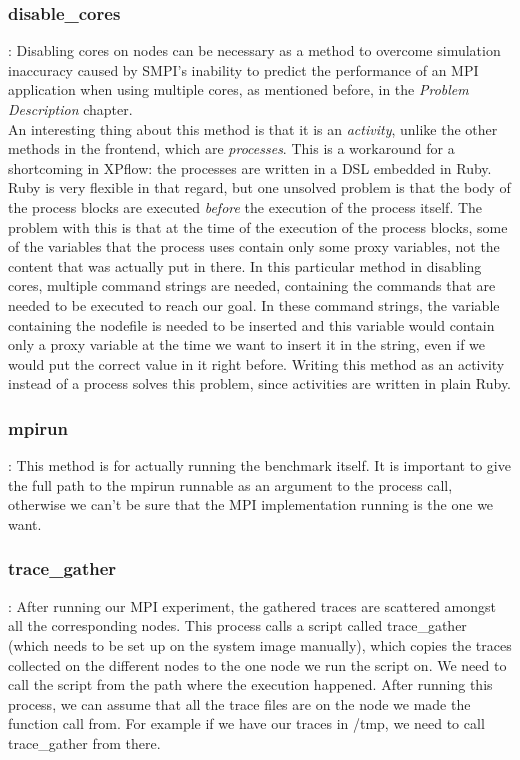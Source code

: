 \subsubsection{disable\_cores}: Disabling cores on nodes can be necessary
as a method to overcome simulation inaccuracy caused by SMPI's
inability to predict the performance of an MPI application when using
multiple cores, as mentioned before, in the \emph{Problem Description}
chapter.\\
An interesting thing about this method is that it is an
\emph{activity}, unlike the other methods in the frontend, which are
\emph{processes}. This is a workaround for a shortcoming in XPflow:
the processes are written in a DSL embedded in Ruby. Ruby is very
flexible in that regard, but one unsolved problem is that the body of
the process blocks are executed \emph{before} the execution of the
process itself. The problem with this is that at the time of the
execution of the process blocks, some of the variables that the
process uses contain only some proxy variables, not the content that
was actually put in there. In this particular method in disabling
cores, multiple command strings are needed, containing the commands
that are needed to be executed to reach our goal. In these command
strings, the variable containing the nodefile is needed to be
inserted and this variable would contain only a proxy variable at the
time we want to insert it in the string, even if we would put the
correct value in it right before. Writing this method as an activity
instead of a process solves this problem, since activities are written
in plain Ruby.
\subsubsection{mpirun}: This method is for actually running the benchmark
itself. It is important to give the full path to the mpirun runnable
as an argument to the process call, otherwise we can't be sure that
the MPI implementation running is the one we want.
\subsubsection{trace\_gather}: After running our MPI experiment, the
gathered traces are scattered amongst all the corresponding
nodes. This process calls a script called trace\_gather (which needs
to be set up on the system image manually), which copies the traces
collected on the
different nodes to the one node we run the script on. We need to call
the script from the path where the execution happened. After running
this process, we can assume that all the trace files are on the node
we made the function call from. For example if we have our traces in
/tmp, we need to call trace\_gather from there.
